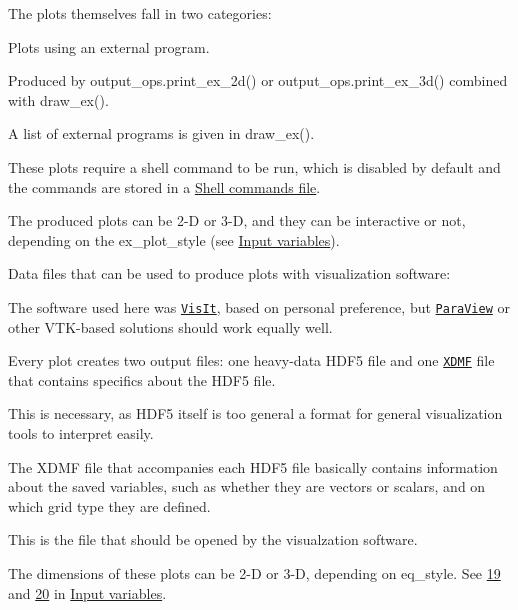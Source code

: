 The plots themselves fall in two categories\+:
\begin{DoxyItemize}
\item Plots using an external program.
\begin{DoxyItemize}
\item Produced by output\+\_\+ops.\+print\+\_\+ex\+\_\+2d() or output\+\_\+ops.\+print\+\_\+ex\+\_\+3d() combined with draw\+\_\+ex().
\item A list of external programs is given in draw\+\_\+ex().
\item These plots require a shell command to be run, which is disabled by default and the commands are stored in a \hyperlink{page_outputs_output_file_shell}{Shell commands file}.
\item The produced plots can be 2-\/D or 3-\/D, and they can be interactive or not, depending on the {\ttfamily ex\+\_\+plot\+\_\+style} (see \hyperlink{page_inputs}{Input variables}).
\end{DoxyItemize}
\item Data files that can be used to produce plots with visualization software\+:
\begin{DoxyItemize}
\item The software used here was \href{https://visit.llnl.gov/}{\tt Vis\+It}, based on personal preference, but \href{https://www.paraview.org/}{\tt Para\+View} or other V\+T\+K-\/based solutions should work equally well.
\item Every plot creates two output files\+: one heavy-\/data H\+D\+F5 file and one \href{www.xdmf.org/}{\tt X\+D\+MF} file that contains specifics about the H\+D\+F5 file.
\item This is necessary, as H\+D\+F5 itself is too general a format for general visualization tools to interpret easily.
\item The X\+D\+MF file that accompanies each H\+D\+F5 file basically contains information about the saved variables, such as whether they are vectors or scalars, and on which grid type they are defined.
\item This is the file that should be opened by the visualzation software.
\item The dimensions of these plots can be 2-\/D or 3-\/D, depending on {\ttfamily eq\+\_\+style}. See \hyperlink{page_inputs_fni19}{19} and \hyperlink{page_inputs_fni20}{20} in \hyperlink{page_inputs}{Input variables}.
\end{DoxyItemize}
\end{DoxyItemize}

